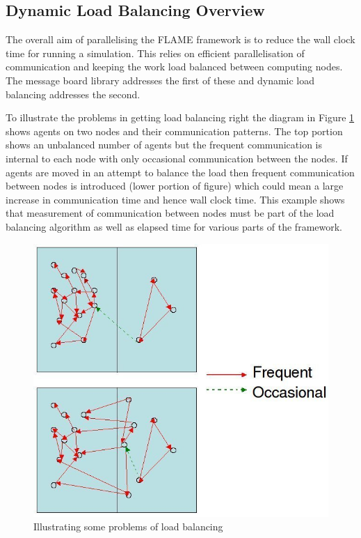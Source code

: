 \subsection{Dynamic Load Balancing Overview}

The overall aim of parallelising the FLAME framework is to reduce the wall clock time for running a simulation. This relies on efficient parallelisation of communication and keeping the work load balanced between computing nodes. The message board library addresses the first of these and dynamic load balancing addresses the second.

To illustrate the problems in getting load balancing right the diagram in Figure \ref{fig:load_balance_problem} shows agents on two nodes and their communication patterns. The top portion shows an unbalanced number of agents but the frequent communication is internal to each node with only occasional communication between the nodes. If agents are moved in an attempt to balance the load then frequent communication between nodes is introduced (lower portion of figure) which could mean a large increase in communication time and hence wall clock time. This example shows that measurement of communication between nodes must be part of the load balancing algorithm as well as elapsed time for various parts of the framework.

\begin{figure}[h]
 \centering
  \includegraphics[scale=0.50]{load_balance.jpg}
 \caption{Illustrating some problems of load balancing}
 \label{fig:load_balance_problem}
\end{figure}

